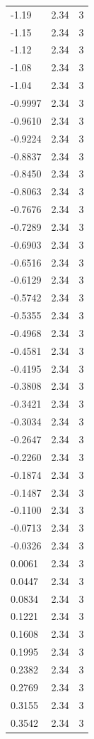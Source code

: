 \begin{longtable}{lrr}
  -1.19 & 2.34 & 3 \\
  -1.15 & 2.34 & 3 \\
  -1.12 & 2.34 & 3 \\
  -1.08 & 2.34 & 3 \\
  -1.04 & 2.34 & 3 \\
  -0.9997 & 2.34 & 3 \\
  -0.9610 & 2.34 & 3 \\
  -0.9224 & 2.34 & 3 \\
  -0.8837 & 2.34 & 3 \\
  -0.8450 & 2.34 & 3 \\
  -0.8063 & 2.34 & 3 \\
  -0.7676 & 2.34 & 3 \\
  -0.7289 & 2.34 & 3 \\
  -0.6903 & 2.34 & 3 \\
  -0.6516 & 2.34 & 3 \\
  -0.6129 & 2.34 & 3 \\
  -0.5742 & 2.34 & 3 \\
  -0.5355 & 2.34 & 3 \\
  -0.4968 & 2.34 & 3 \\
  -0.4581 & 2.34 & 3 \\
  -0.4195 & 2.34 & 3 \\
  -0.3808 & 2.34 & 3 \\
  -0.3421 & 2.34 & 3 \\
  -0.3034 & 2.34 & 3 \\
  -0.2647 & 2.34 & 3 \\
  -0.2260 & 2.34 & 3 \\
  -0.1874 & 2.34 & 3 \\
  -0.1487 & 2.34 & 3 \\
  -0.1100 & 2.34 & 3 \\
  -0.0713 & 2.34 & 3 \\
  -0.0326 & 2.34 & 3 \\
  0.0061 & 2.34 & 3 \\
  0.0447 & 2.34 & 3 \\
  0.0834 & 2.34 & 3 \\
  0.1221 & 2.34 & 3 \\
  0.1608 & 2.34 & 3 \\
  0.1995 & 2.34 & 3 \\
  0.2382 & 2.34 & 3 \\
  0.2769 & 2.34 & 3 \\
  0.3155 & 2.34 & 3 \\
  0.3542 & 2.34 & 3 \\

\end{longtable}
